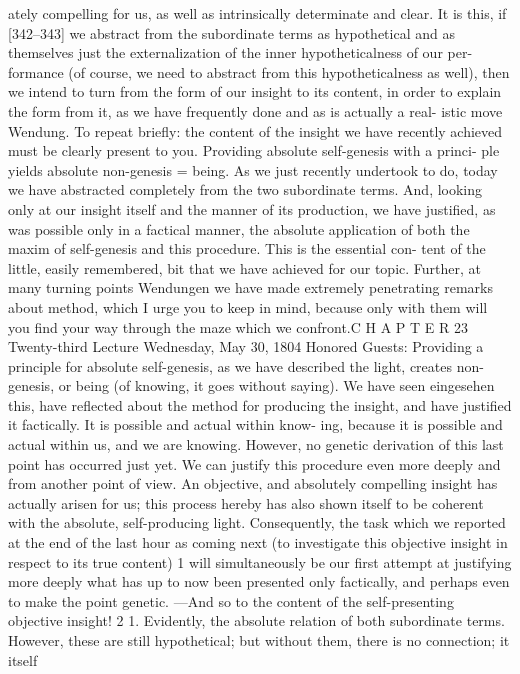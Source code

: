 ately compelling for us, as well as intrinsically determinate and clear. It is this,
if [342–343] we abstract from the subordinate terms as hypothetical and as
themselves just the externalization of the inner hypotheticalness of our per-
formance (of course, we need to abstract from this hypotheticalness as well),
then we intend to turn from the form of our insight to its content, in order to
explain the form from it, as we have frequently done and as is actually a real-
istic move {Wendung}.
To repeat briefly: the content of the insight we have recently achieved
must be clearly present to you. Providing absolute self-genesis with a princi-
ple yields absolute non-genesis = being. As we just recently undertook to do,
today we have abstracted completely from the two subordinate terms. And,
looking only at our insight itself and the manner of its production, we have
justified, as was possible only in a factical manner, the absolute application of
both the maxim of self-genesis and this procedure. This is the essential con-
tent of the little, easily remembered, bit that we have achieved for our topic.
Further, at many turning points {Wendungen} we have made extremely
penetrating remarks about method, which I urge you to keep in mind, because
only with them will you find your way through the maze which we confront.C H A P T E R
23
Twenty-third Lecture
Wednesday, May 30, 1804
Honored Guests:
Providing a principle for absolute self-genesis, as we have described the light,
creates non-genesis, or being (of knowing, it goes without saying). We have
seen {eingesehen} this, have reflected about the method for producing the
insight, and have justified it factically. It is possible and actual within know-
ing, because it is possible and actual within us, and we are knowing. However,
no genetic derivation of this last point has occurred just yet.
We can justify this procedure even more deeply and from another point
of view. An objective, and absolutely compelling insight has actually arisen for
us; this process hereby has also shown itself to be coherent with the absolute,
self-producing light. Consequently, the task which we reported at the end of
the last hour as coming next (to investigate this objective insight in respect to its
true content) 1 will simultaneously be our first attempt at justifying more deeply
what has up to now been presented only factically, and perhaps even to make
the point genetic.
—And so to the content of the self-presenting objective insight! 2
1. Evidently, the absolute relation of both subordinate terms. However,
these are still hypothetical; but without them, there is no connection; it itself
